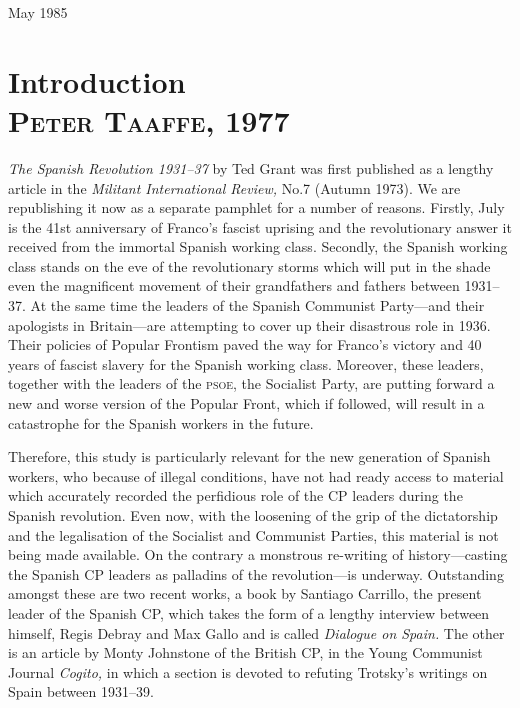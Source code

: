 \documentclass[
  12pt,
  pagesize,
  paper = 6in:9in,
  DIV = 12,
  openany
]{scrbook}
\newcommand{\ac}[1]{\textsc{\lowercase{#1}}}
\begin{document}
\begin{flushright}
  May 1985
\end{flushright}

\mainmatter

\chapter{Introduction \\ \textsc{Peter Taaffe,} 1977}

\emph{The Spanish Revolution 1931--37} by Ted Grant was first published
as a lengthy article in the \emph{Militant International Review,} No.7
(Autumn 1973). We are republishing it now as a separate pamphlet
for a number of reasons. Firstly, July is the 41st anniversary of Franco’s
fascist uprising and the revolutionary answer it received from
the immortal Spanish working class. Secondly, the Spanish working
class stands on the eve of the revolutionary storms which will
put in the shade even the magnificent movement of their grandfathers
and fathers between 1931--37. At the same time the leaders
of the Spanish Communist Party---and their apologists in Britain---are
attempting to cover up their disastrous role in 1936. Their policies
of Popular Frontism paved the way for Franco’s victory and 40 years
of fascist slavery for the Spanish working class. Moreover, these
leaders, together with the leaders of the \ac{PSOE,} the Socialist Party,
are putting forward a new and worse version of the Popular Front,
which if followed, will result in a catastrophe for the Spanish workers
in the future.

Therefore, this study is particularly relevant for the new generation
of Spanish workers, who because of illegal conditions, have not
had ready access to material which accurately recorded the perfidious
role of the CP leaders during the Spanish revolution. Even now, with
the loosening of the grip of the dictatorship and the legalisation of
the Socialist and Communist Parties, this material is not being made
available. On the contrary a monstrous re-writing of history---casting
the Spanish CP leaders as palladins of the revolution---is underway.
Outstanding amongst these are two recent works, a book by Santiago
Carrillo, the present leader of the Spanish CP, which takes the
form of a lengthy interview between himself, Regis Debray and Max
Gallo and is called \emph{Dialogue on Spain.} The other is an article by Monty
Johnstone of the British CP, in the Young Communist Journal
\emph{Cogito,} in which a section is devoted to refuting Trotsky’s writings
on Spain between 1931--39.
\end{document}
